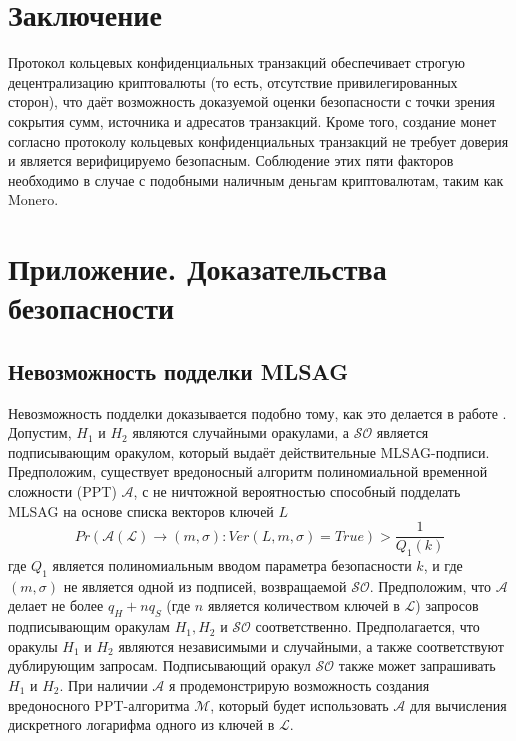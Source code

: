 \documentclass{mrl}
\theoremstyle{definition}
\numberwithin{thm}{section}
\begin{document}
\section{Заключение}
Протокол кольцевых конфиденциальных транзакций обеспечивает строгую децентрализацию криптовалюты (то есть, отсутствие привилегированных сторон), что даёт возможность доказуемой оценки безопасности с точки зрения сокрытия сумм, источника и адресатов транзакций. Кроме того, создание монет согласно протоколу кольцевых конфиденциальных транзакций не требует доверия и является верифицируемо безопасным. Соблюдение этих пяти факторов необходимо в случае с подобными наличным деньгам криптовалютам, таким как Monero.




\appendix

\section{Приложение. Доказательства безопасности}

\subsection{Невозможность подделки MLSAG}

Невозможность подделки доказывается подобно тому, как это делается в работе \cite[Теорема 1]{LWW}. Допустим, $H_{1}$ и $H_{2}$ являются случайными оракулами, а $\mathcal{SO}$ является подписывающим оракулом, который выдаёт действительные MLSAG-подписи. Предположим, существует вредоносный алгоритм полиномиальной временной сложности (PPT) $\mathcal{A}$, с не ничтожной вероятностью способный подделать MLSAG на основе списка векторов ключей $L$
\[
Pr\left(\mathcal{A}\left(\mathcal{L}\right)\to\left(m,\sigma\right):Ver\left(L,m,\sigma\right)=True\right)>\frac{1}{Q_{1}\left(k\right)}
\]
где $Q_{1}$ является полиномиальным вводом параметра безопасности $k$, и где $\left(m,\sigma\right)$ не является одной из подписей, возвращаемой $\mathcal{S}\mathcal{O}$. Предположим, что $\mathcal{A}$ делает не более $q_{H}+nq_{S}$ (где $n$ является количеством ключей в $\mathcal{L}$)
запросов подписывающим оракулам $H_{1},H_{2}$ и $\mathcal{SO}$ соответственно. Предполагается, что оракулы $H_{1}$ и $H_{2}$ являются независимыми и случайными, а также соответствуют дублирующим запросам. Подписывающий оракул $\mathcal{SO}$ также может запрашивать $H_{1}$ и $H_{2}$. При наличии $\mathcal{A}$ я продемонстрирую возможность создания вредоносного PPT-алгоритма $\mathcal{M}$, который будет использовать $\mathcal{A}$ для вычисления дискретного логарифма одного из ключей в $\mathcal{L}$.
\end{document}
